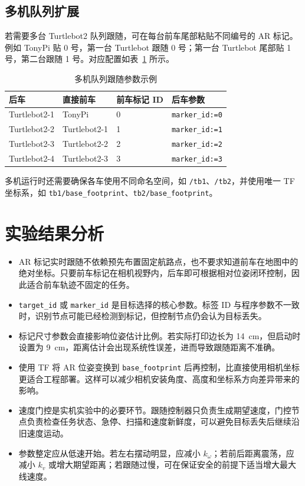 \documentclass[UTF8,a4paper,12pt]{ctexart}
\begin{document}
	\subsection{多机队列扩展}
	若需要多台 Turtlebot2 队列跟随，可在每台前车尾部粘贴不同编号的 AR 标记。例如 TonyPi 贴 0 号，第一台 Turtlebot 跟随 0 号；第一台 Turtlebot 尾部贴 1 号，第二台跟随 1 号。对应配置如表~\ref{tab:multi} 所示。

	\begin{table}[H]
		\centering
		\caption{多机队列跟随参数示例}
		\label{tab:multi}
		\begin{tabular}{llll}
			\toprule
			后车 & 直接前车 & 前车标记 ID & 后车参数 \\
			\midrule
			Turtlebot2-1 & TonyPi & 0 & \texttt{marker\_id:=0} \\
			Turtlebot2-2 & Turtlebot2-1 & 1 & \texttt{marker\_id:=1} \\
			Turtlebot2-3 & Turtlebot2-2 & 2 & \texttt{marker\_id:=2} \\
			Turtlebot2-4 & Turtlebot2-3 & 3 & \texttt{marker\_id:=3} \\
			\bottomrule
		\end{tabular}
	\end{table}
	多机运行时还需要确保各车使用不同命名空间，如 \texttt{/tb1}、\texttt{/tb2}，并使用唯一 TF 坐标系，如 \texttt{tb1/base\_footprint}、\texttt{tb2/base\_footprint}。

	\section{实验结果分析}
	\begin{itemize}
		\item AR 标记实时跟随不依赖预先布置固定航路点，也不要求知道前车在地图中的绝对坐标。只要前车标记在相机视野内，后车即可根据相对位姿闭环控制，因此适合前车轨迹不固定的任务。
		\item \texttt{target\_id} 或 \texttt{marker\_id} 是目标选择的核心参数。标签 ID 与程序参数不一致时，识别节点可能已经检测到标记，但控制节点仍会认为目标丢失。
		\item 标记尺寸参数会直接影响位姿估计比例。若实际打印边长为 \SI{14}{cm}，但启动时设置为 \SI{9}{cm}，距离估计会出现系统性误差，进而导致跟随距离不准确。
		\item 使用 TF 将 AR 位姿变换到 \texttt{base\_footprint} 后再控制，比直接使用相机坐标更适合工程部署。这样可以减少相机安装角度、高度和坐标系方向差异带来的影响。
		\item 速度门控是实机实验中的必要环节。跟随控制器只负责生成期望速度，门控节点负责检查任务状态、急停、扫描和速度新鲜度，可以避免目标丢失后继续沿旧速度运动。
		\item 参数整定应从低速开始。若左右摆动明显，应减小 \(k_\omega\)；若前后距离震荡，应减小 \(k_v\) 或增大期望距离；若跟随过慢，可在保证安全的前提下适当增大最大线速度。
	\end{itemize}
\end{document}
